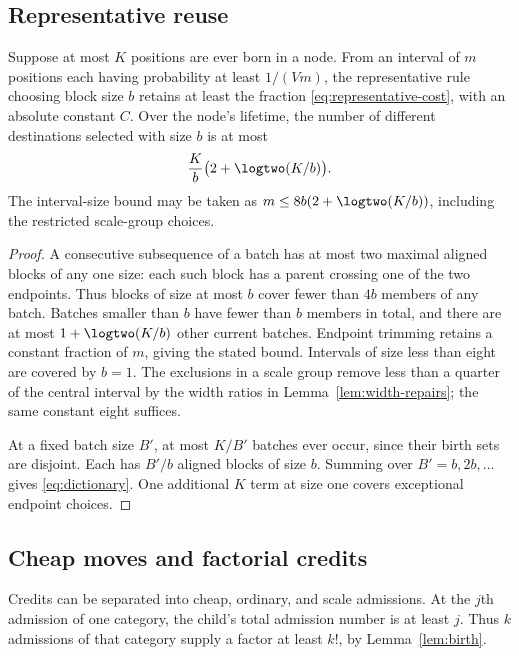 \subsection{Representative reuse}

\begin{lemma}
\label{lem:dictionary}
Suppose at most $K$ positions are ever born in a node. From an interval of
$m$ positions each having probability at least $1/(Vm)$, the representative
rule choosing block size $b$ retains at least the fraction
\eqref{eq:representative-cost}, with an absolute constant $C$.
Over the node's lifetime, the number of different destinations selected
with size $b$ is at most
\begin{equation}
                       \frac Kb\bigl(2+\logtwo(K/b)\bigr).
\label{eq:dictionary}
\end{equation}
The interval-size bound may be taken as
$m\leq8b(2+\logtwo(K/b))$, including the restricted scale-group choices.
\end{lemma}
\begin{proof}
A consecutive subsequence of a batch has at most two maximal aligned blocks
of any one size: each such block has a parent crossing one of the two
endpoints. Thus blocks of size at most $b$ cover fewer than $4b$ members
of any batch. Batches smaller than $b$ have fewer than $b$ members in total,
and there are at most $1+\logtwo(K/b)$ other current batches.
Endpoint trimming retains a constant fraction of $m$, giving the stated
bound. Intervals of size less than eight are covered by $b=1$.
The exclusions in a scale group remove less than a quarter of the central
interval by the width ratios in Lemma~\ref{lem:width-repairs}; the same
constant eight suffices.

At a fixed batch size $B'$, at most $K/B'$ batches ever occur, since their
birth sets are disjoint. Each has $B'/b$ aligned blocks of size $b$.
Summing over $B'=b,2b,\ldots$ gives \eqref{eq:dictionary}.
One additional $K$ term at size one covers exceptional endpoint choices.
\end{proof}

\subsection{Cheap moves and factorial credits}

Credits can be separated into cheap, ordinary, and scale admissions.
At the $j$th admission of one category, the child's total admission number
is at least $j$. Thus $k$ admissions of that category supply a factor
at least $k!$, by Lemma~\ref{lem:birth}.

